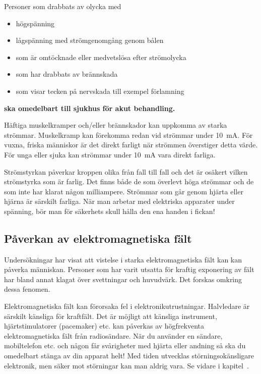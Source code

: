 \bigskip
\noindent
\begin{minipage}{0.19\columnwidth}
\Huge{\selectfont{}\relax}
\end{minipage}
\begin{minipage}{0.7\columnwidth}
Personer som drabbats av olycka med
\begin{itemize}
\item högspänning
\item lågspänning med strömgenomgång genom bålen
\item som är omtöcknade eller medvetslösa efter strömolycka
\item som har drabbats av brännskada
\item som visar tecken på nervskada till exempel förlamning
\end{itemize}
\textbf{ska omedelbart till sjukhus för akut behandling.}
\end{minipage}

\vspace{1ex}
Häftiga muskelkramper och/eller brännskador kan uppkomma av starka strömmar.
Muskelkramp kan förekomma redan vid strömmar under \qty{10}{\milli\ampere}.
För vuxna, friska människor är det direkt farligt när strömmen överstiger
detta värde.
För unga eller sjuka kan strömmar under \qty{10}{\milli\ampere} vara direkt
farliga.

Strömstyrkan påverkar kroppen olika från fall till fall och det är osäkert
vilken strömstyrka som är farlig.
Det finns både de som överlevt höga strömmar och de som inte har klarat någon
milliampere.
Strömmar som går genom hjärta eller hjärna är särskilt farliga.
När man arbetar med elektriska apparater under spänning, bör man för säkerhets
skull hålla den ena handen i fickan!

\subsection{Påverkan av elektromagnetiska fält}

Undersökningar har visat att vistelse i starka elektromagnetiska fält
kan kan påverka människan.
Personer som har varit utsatta för kraftig exponering av fält har bland annat
klagat över svettningar och huvudvärk.
Det forskas omkring dessa fenomen.

Elektromagnetiska fält kan förorsaka fel i elektronikutrustningar.
Halvledare är särskilt känsliga för kraftfält.
Det är möjligt att känsliga instrument, hjärtstimulatorer (pacemaker) etc. kan
påverkas av högfrekventa elektromagnetiska fält från radiosändare.
När du använder en sändare, mobiltelefon etc. och någon får svårigheter med
hjärta eller andning så ska du omedelbart stänga av din apparat helt!
Med tiden utvecklas störningsokänsligare elektronik, men säker mot störningar
kan man aldrig vara. Se vidare i kapitel~.


